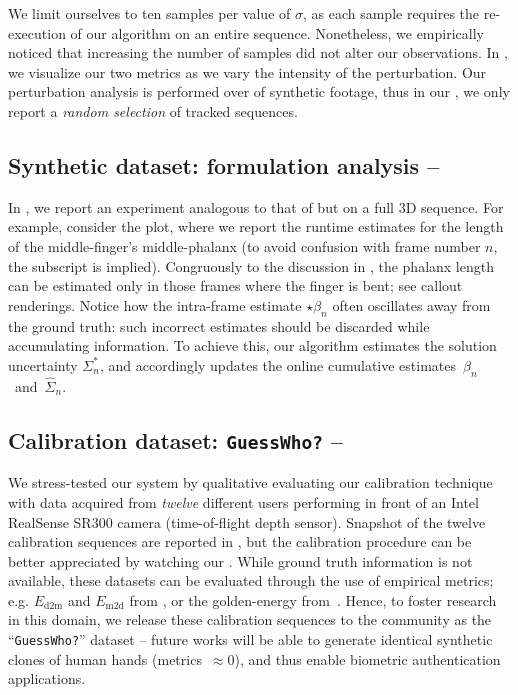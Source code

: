 We limit ourselves to ten samples per value of $\sigma$, as each sample requires the re-execution of our algorithm on an entire sequence. Nonetheless, we empirically noticed that increasing the number of samples did not alter our observations.
In , we visualize our two metrics as we vary the intensity of the perturbation. Our perturbation analysis is performed over  of synthetic footage, thus in our \VideoSynth{}, we only report a \emph{random selection} of tracked sequences.
% 

\subsection{Synthetic dataset: formulation analysis -- }
\label{sec:analysis}
In , we report an experiment analogous to that of  but on a full 3D sequence. For example, consider the {\small \todo{$\beta_{[?]}$}} plot, where we report the runtime estimates for the length of the middle-finger's middle-phalanx (to avoid confusion with frame number $n$, the \todo{{\scriptsize $[?]$}} subscript is implied). Congruously to the discussion in , the phalanx length can be estimated only in those frames where the finger is bent; see callout renderings.
Notice how the intra-frame estimate {\small $\star\beta_n$} often oscillates away from the ground truth: 
such incorrect estimates should be discarded while accumulating information. To achieve this, our algorithm estimates the solution uncertainty {\small $\Sigma^*_n$}, and accordingly updates the online cumulative estimates~{\small $\hat\beta_n$}~and~{\small $\hat\Sigma_n$}.

\subsection{Calibration dataset: \texttt{GuessWho?} -- }
\label{sec:evaldataset}
We stress-tested our system by qualitative evaluating our calibration technique with data acquired from \emph{twelve} different users performing in front of an Intel RealSense SR300 camera (time-of-flight depth sensor). 
Snapshot of the twelve calibration sequences are reported in , but the calibration procedure can be better appreciated by watching our \VideoQualitative{}.
While ground truth information is not available, these datasets can be evaluated through the use of empirical metrics; e.g. $E_\text{d2m}$ and $E_\text{m2d}$ from \cite{tkach2016sphere}, or the golden-energy from~\cite{taylor2016joint}.
Hence, to foster research in this domain, we release these calibration sequences to the community as the ``\texttt{GuessWho?}'' dataset -- future works will be able to generate identical synthetic clones of human hands (metrics~$\approx 0$), and thus enable biometric authentication applications.

